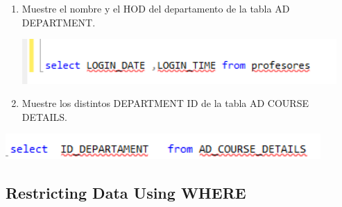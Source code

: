 \documentclass[12pt,letterpaper]{article}
\begin{document}
\begin{enumerate}[1.]
  
    \item Muestre el nombre y el HOD del departamento de la tabla AD DEPARTMENT.
    
   
\begin{center}
\includegraphics[width=12cm]{./IMAGENES/imagen6_4}
\end{center}

     
      
    \item Muestre los distintos DEPARTMENT ID de la tabla AD COURSE DETAILS.   
\end{enumerate}


\begin{center}
\includegraphics[width=12cm]{./IMAGENES/imagen6_2_5}
\end{center}

     










\newpage
\subsection{Restricting Data Using WHERE} 
\end{document}
